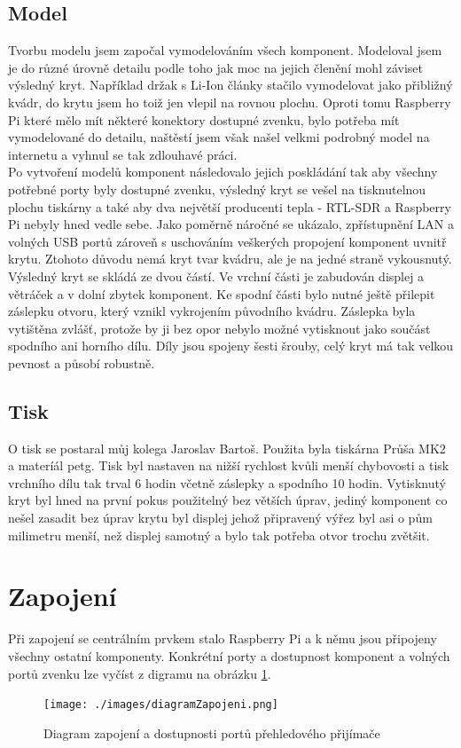 \documentclass{ctuthesis}
\begin{document}
\subsection{Model}
Tvorbu modelu jsem započal vymodelováním všech komponent. Modeloval jsem je do různé úrovně detailu podle toho jak moc na jejich členění mohl záviset výsledný kryt. Například držak s Li-Ion články stačilo vymodelovat jako přibližný kvádr, do krytu jsem ho toiž jen vlepil na rovnou plochu. Oproti tomu Raspberry Pi které mělo mít některé konektory dostupné zvenku, bylo potřeba mít vymodelované do detailu, naštěstí jsem však našel velkmi podrobný model na internetu a vyhnul se tak zdlouhavé práci.\\
Po vytvoření modelů komponent následovalo jejich poskládání tak aby všechny potřebné porty byly dostupné zvenku, výsledný kryt se vešel na tisknutelnou plochu tiskárny a také aby dva největší producenti tepla - RTL-SDR a Raspberry Pi nebyly hned vedle sebe. Jako poměrně náročné se ukázalo, zpřístupnění LAN a volných USB portů zároveň s uschováním veškerých propojení komponent uvnitř krytu. Ztohoto důvodu nemá kryt tvar kvádru, ale je na jedné straně vykousnutý. \\
Výsledný kryt se skládá ze dvou částí. Ve vrchní části je zabudován displej a větráček a v dolní zbytek komponent. Ke spodní části bylo nutné ještě přilepit záslepku otvoru, který vznikl vykrojením původního kvádru. Záslepka byla vytištěna zvlášť, protože by ji bez opor nebylo možné vytisknout jako součást spodního ani horního dílu. Díly jsou spojeny šesti šrouby, celý kryt má tak velkou pevnost a působí robustně.


\subsection{Tisk}
O tisk se postaral můj kolega Jaroslav Bartoš. Použita byla tiskárna Průša MK2 a materíál petg. Tisk byl nastaven na nižší rychlost kvůli menší chybovosti a tisk vrchního dílu tak trval 6 hodin včetně záslepky a spodního 10 hodin. Vytisknutý kryt byl hned na první pokus použitelný bez větších úprav, jediný komponent co nešel zasadit bez úprav krytu byl displej jehož připravený výřez byl asi o pům milimetru menší, než displej samotný a bylo tak potřeba otvor trochu zvětšit.


\section{Zapojení}
Při zapojení se centrálním prvkem stalo Raspberry Pi a k němu jsou připojeny všechny ostatní komponenty. Konkrétní porty a dostupnost komponent a volných portů zvenku lze vyčíst z digramu na obrázku \ref{zapojení}.
\begin{figure}
\caption{Diagram zapojení a dostupnosti portů přehledového přijímače}
\texttt{[image: ./images/diagramZapojeni.png]}
\label{zapojení}
\end{figure}
\end{document}
